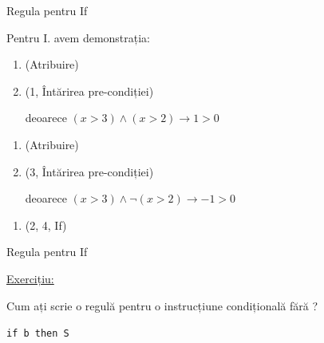\begin{frame}{Regula pentru If}

\begin{example}[cont.]
Pentru I.  avem demonstrația:
\begin{enumerate}[<+->]
	\item {} \hfill (Atribuire)
	\item {}  \hfill (1, Întărirea pre-condiției)

	deoarece $(x>3) \wedge (x > 2) \to 1>0$
\end{enumerate}

\medskip 
{}
\begin{enumerate}[<+->]
{\setcounter{enumi}{2}}
	\item {} \hfill (Atribuire)
	\item {}  \hfill (3, Întărirea pre-condiției)

	   deoarece $(x>3) \wedge \neg(x>2) \to -1 > 0 $
\end{enumerate}

\medskip
{}
\begin{enumerate}[<+->]
	{\setcounter{enumi}{4}}
	\item {} \hfill (2, 4, If)
\end{enumerate}	
\end{example}
\end{frame}

\begin{frame}{Regula pentru If}

{\color{red}\underline{Exercițiu:}} 

Cum ați scrie o regulă pentru o instrucțiune condițională fără ?
\begin{center}
\texttt{if b then S}
\end{center}

\end{frame}

